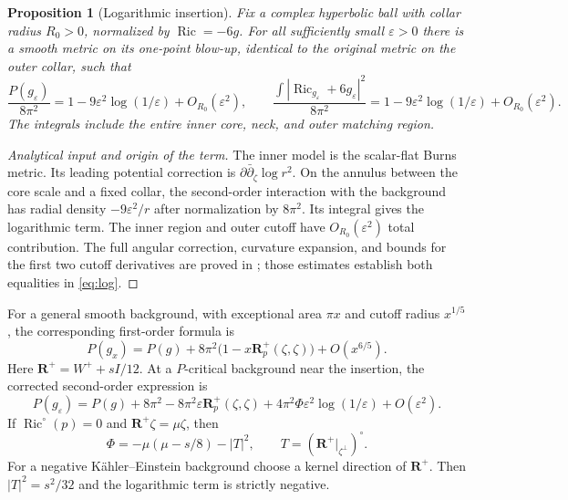 \documentclass[11pt,a4paper]{article}
\newtheorem{proposition}[theorem]{Proposition}
\theoremstyle{definition}\newtheorem{definition}[theorem]{Definition}
\theoremstyle{remark}\newtheorem{remark}[theorem]{Remark}
\newcommand{\Ric}{\operatorname{Ric}}
\newcommand{\eps}{\varepsilon}
\begin{document}
\begin{proposition}[Logarithmic insertion]\label{prop:log}
Fix a complex hyperbolic ball with collar radius $R_0>0$, normalized by $\Ric=-6g$. For all sufficiently small $\eps>0$ there is a smooth metric on its one-point blow-up, identical to the original metric on the outer collar, such that
\begin{equation}\label{eq:log}
 \frac{P(g_\eps)}{8\pi^2}
 =1-9\eps^2\log(1/\eps)+O_{R_0}(\eps^2),\qquad
 \frac{\int|\Ric_{g_\eps}+6g_\eps|^2}{8\pi^2}
 =1-9\eps^2\log(1/\eps)+O_{R_0}(\eps^2).
\end{equation}
The integrals include the entire inner core, neck, and outer matching region.
\end{proposition}
\begin{proof}[Analytical input and origin of the term]
The inner model is the scalar-flat Burns metric. Its leading potential correction is $\partial\bar\partial_\zeta\log r^2$. On the annulus between the core scale and a fixed collar, the second-order interaction with the background has radial density $-9\eps^2/r$ after normalization by $8\pi^2$. Its integral gives the logarithmic term. The inner region and outer cutoff have $O_{R_0}(\eps^2)$ total contribution. The full angular correction, curvature expansion, and bounds for the first two cutoff derivatives are proved in \cite{RepoInsertion}; those estimates establish both equalities in \eqref{eq:log}.
\end{proof}

For a general smooth background, with exceptional area $\pi x$ and cutoff radius $x^{1/5}$, the corresponding first-order formula is
\begin{equation}\label{eq:generalBurns}
 P(g_x)=P(g)+8\pi^2\bigl(1-x\mathbf R_p^+(\zeta,\zeta)\bigr)+O(x^{6/5}).
\end{equation}
Here $\mathbf R^+=W^++sI/12$. At a $P$-critical background near the insertion, the corrected second-order expression is
\begin{equation}\label{eq:Burns2}
 P(g_\eps)=P(g)+8\pi^2-8\pi^2\eps\mathbf R_p^+(\zeta,\zeta)
 +4\pi^2\Phi\eps^2\log(1/\eps)+O(\eps^2).
\end{equation}
If $\Ric^\circ(p)=0$ and $\mathbf R^+\zeta=\mu\zeta$, then
\[
 \Phi=-\mu(\mu-s/8)-|T|^2,\qquad T=(\mathbf R^+|_{\zeta^\perp})^\circ.
\]
For a negative Kähler--Einstein background choose a kernel direction of $\mathbf R^+$. Then $|T|^2=s^2/32$ and the logarithmic term is strictly negative.
\end{document}
